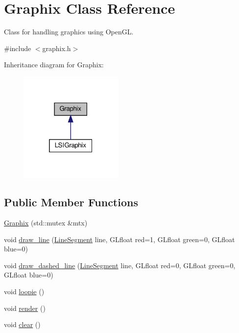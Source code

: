 \hypertarget{classGraphix}{}\section{Graphix Class Reference}
\label{classGraphix}


Class for handling graphics using Open\+GL.  




{\ttfamily \#include $<$graphix.\+h$>$}



Inheritance diagram for Graphix\+:
\nopagebreak
\begin{figure}[H]
\begin{center}
\leavevmode
\includegraphics[width=145pt]{classGraphix__inherit__graph}
\end{center}
\end{figure}
\subsection*{Public Member Functions}
\begin{DoxyCompactItemize}
\item 
\hyperlink{classGraphix_a1d4cb173e0d22fee13a657489b7b55de}{Graphix} (std\+::mutex \&mtx)
\item 
void \hyperlink{classGraphix_a74af1cd957a0fc3b5e0ee1f951a994e1}{draw\+\_\+line} (\hyperlink{classLineSegment}{Line\+Segment} line, G\+Lfloat red=1, G\+Lfloat green=0, G\+Lfloat blue=0)
\item 
void \hyperlink{classGraphix_a9a1ebf0c6d508ce4686b9794c4dec871}{draw\+\_\+dashed\+\_\+line} (\hyperlink{classLineSegment}{Line\+Segment} line, G\+Lfloat red=0, G\+Lfloat green=0, G\+Lfloat blue=0)
\item 
void \hyperlink{classGraphix_af7b539b3ab40274dc2f89d060cba0c51}{loopie} ()
\item 
void \hyperlink{classGraphix_a3e24075d5ded3741a9c14a7978b721d8}{render} ()
\item 
void \hyperlink{classGraphix_a1ac1a5725a869ef074da6fe3cab29b0e}{clear} ()
\end{DoxyCompactItemize}
